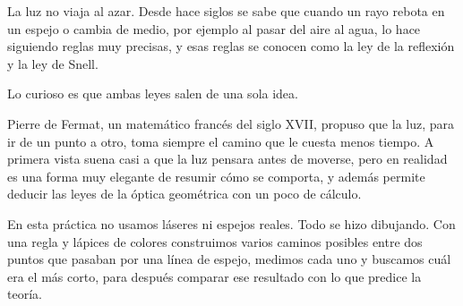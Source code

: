 La luz no viaja al azar. Desde hace siglos se sabe que cuando un rayo rebota en un espejo o cambia de medio, por ejemplo al pasar del aire al agua, lo hace siguiendo reglas muy precisas, y esas reglas se conocen como la ley de la reflexión y la ley de Snell.

Lo curioso es que ambas leyes salen de una sola idea.

Pierre de Fermat, un matemático francés del siglo XVII, propuso que la luz, para ir de un punto a otro, toma siempre el camino que le cuesta menos tiempo. A primera vista suena casi a que la luz pensara antes de moverse, pero en realidad es una forma muy elegante de resumir cómo se comporta, y además permite deducir las leyes de la óptica geométrica con un poco de cálculo.

En esta práctica no usamos láseres ni espejos reales. Todo se hizo dibujando. Con una regla y lápices de colores construimos varios caminos posibles entre dos puntos que pasaban por una línea de espejo, medimos cada uno y buscamos cuál era el más corto, para después comparar ese resultado con lo que predice la teoría.
